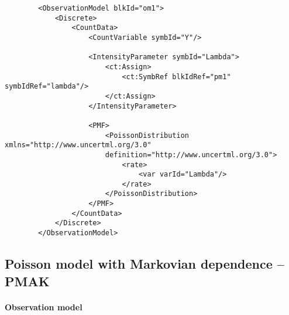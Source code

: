 \lstset{language=XML}
\begin{lstlisting}				
        <ObservationModel blkId="om1">
            <Discrete>
                <CountData>
                    <CountVariable symbId="Y"/>
                    
                    <IntensityParameter symbId="Lambda">
                        <ct:Assign>
                            <ct:SymbRef blkIdRef="pm1" symbIdRef="lambda"/>
                        </ct:Assign>
                    </IntensityParameter>
                    
                    <PMF>
                        <PoissonDistribution xmlns="http://www.uncertml.org/3.0" 
                        definition="http://www.uncertml.org/3.0">
                            <rate>
                                <var varId="Lambda"/>
                            </rate>
                        </PoissonDistribution>
                    </PMF>
                </CountData>
            </Discrete>
        </ObservationModel>
\end{lstlisting}


\subsection{Poisson model with Markovian dependence -- PMAK}
\label{subsec:PMAKmodel}

\paragraph{Observation model}

